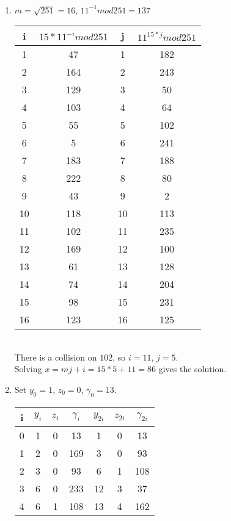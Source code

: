 \documentclass{assignment}
\begin{document}
\begin{problemlist}
\pbitem
\begin{problem}
\end{problem}
\begin{answer}
  \\
  \begin{enumerate}
  \item
    $m = \sqrt{251} = 16$, $11^{-1}mod251 = 137$\\
    \begin{tabular}{c|c|c|c}
      i & $15 * 11^{-i}mod251$&j & $11^{15*j}mod251$\\
      \hline
      1 & 47&1 & 182\\
      2 & 164&2 & 243\\
      3 & 129&3 & 50\\
      4 & 103&4 & 64\\
      5 & 55&5 & 102\\
      6 & 5&6 & 241\\
      7 & 183&7 & 188\\
      8 & 222&8 & 80\\
      9 & 43&9 & 2\\
      10 & 118&10 & 113\\
      11 & 102&11 & 235\\
      12 & 169&12 & 100\\
      13 & 61&13 & 128\\
      14 & 74&14 & 204\\
      15 & 98&15 & 231\\
      16 & 123&16 & 125\\
    \end{tabular}
    \\There is a collision on $102$, so $i=11$, $j=5$.\\
    Solving $x = mj + i = 15*5 + 11 = 86$ gives the solution.\\
  \item
    Set $y_0=1$, $z_0=0$, $\gamma_0=13$.\\
    \begin{tabular}{c||c|c|c||c|c|c}
      i & $y_i$ & $z_i$ &$\gamma_i$ &$y_{2i}$ & $z_{2i}$ & $\gamma_{2i}$\\
      \hline
      0 & 1  & 0 & 13  & 1   & 0  & 13\\
      1 & 2  & 0 & 169 & 3   & 0  & 93\\
      2 & 3  & 0 & 93  & 6   & 1  & 108\\
      3 & 6  & 0 & 233 & 12  & 3  & 37\\
      4 & 6  & 1 & 108 & 13  & 4  & 162\\

\end{tabular}
\end{enumerate}
\end{answer}
\end{problemlist}
\end{document}
